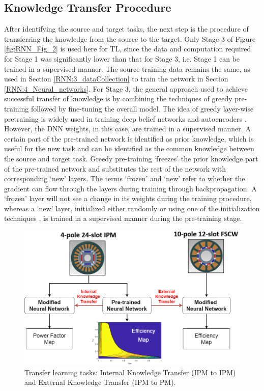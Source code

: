\subsection{Knowledge Transfer Procedure}
After identifying the source and target tasks, the next step is the procedure of transferring the knowledge from the source to the target. Only Stage 3 of Figure \ref{fig:RNN_Fig_2} is used here for TL, since the data and computation required for Stage 1 was significantly lower than that for Stage 3, i.e. Stage 1 can be trained in a supervised manner. The source training data remains the same, as used in Section \ref{RNN:3_dataCollection} to train the network in Section \ref{RNN:4_Neural_networks}.
For Stage 3, the general approach used to achieve successful transfer of knowledge is by combining the techniques of greedy pre-training followed by fine-tuning the overall model. The idea of greedy layer-wise pretraining is widely used in training deep belief networks and autoencoders \parencite{goodfellow2014generative}. However, the DNN weights, in this case, are trained in a supervised manner. A certain part of the pre-trained network is identified as prior knowledge, which is useful for the new task and can be identified as the common knowledge between the source and target task. Greedy pre-training ‘freezes’ the prior knowledge part of the pre-trained network and substitutes the rest of the network with corresponding ‘new’ layers. The terms ‘frozen’ and ‘new’ refer to whether the gradient can flow through the layers during training through backpropagation. A ‘frozen’ layer will not see a change in its weights during the training procedure, whereas a ‘new’ layer, initialized either randomly or using one of the initialization techniques \parencite{goodfellow2014generative}, is trained in a supervised manner during the pre-training stage.

\begin{figure}[h!]
    \centering
    \includegraphics[width=\textwidth]{Figures/Chp_RNN/Fig_3.png}
    \caption{Transfer learning tasks: Internal Knowledge Transfer (IPM to IPM) and External Knowledge Transfer (IPM to PM).}
    \label{fig:RNN_Fig_3}
\end{figure}

